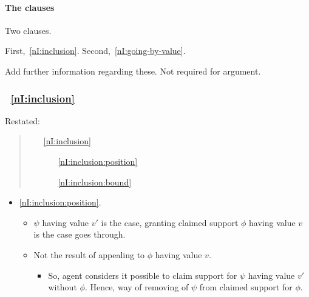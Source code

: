 \paragraph{The clauses}
\label{sec:nI:arg:clauses}

\begin{note}
  Two clauses.

  First,~\ref{nI:inclusion}.
  Second,~\ref{nI:going-by-value}.

  Add further information regarding these.
  Not required for argument.
\end{note}

\subsubsection{~\ref{nI:inclusion}}

\begin{note}[\ref{nI:inclusion}]
  Restated:
  \begin{quote}
    \begin{enumerate}
    \item[\ref{nI:inclusion}]
      \nIClauseInclusion{}
      \begin{enumerate}
      \item[\ref{nI:inclusion:position}] \nIClauseInclusionPosition{}
      \item[\ref{nI:inclusion:bound}] \nIClauseInclusioBound{}
      \end{enumerate}
    \end{enumerate}
  \end{quote}
\end{note}

\begin{note}
  \begin{itemize}
  \item \ref{nI:inclusion:position}.
    \begin{itemize}
    \item \(\psi\) having value \(v'\) is the case, granting claimed support \(\phi\) having value \(v\) is the case goes through.
    \item Not the result of appealing to \(\phi\) having value \(v\).
      \begin{itemize}
      \item So, agent considers it possible to claim support for \(\psi\) having value \(v'\) without \(\phi\).
        Hence, way of removing \requ{} of \(\psi\) from claimed support for \(\phi\).
      \end{itemize}
    \end{itemize}
  \end{itemize}
\end{note}

